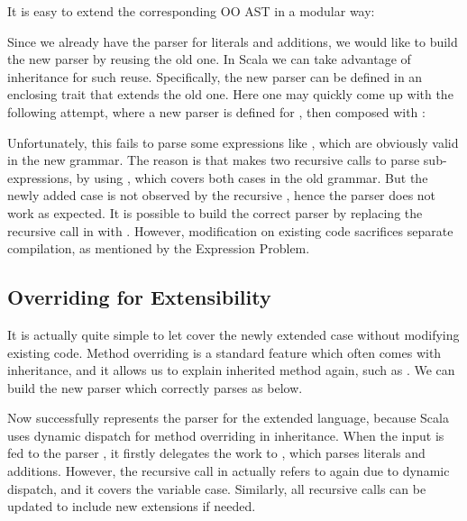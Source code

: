 It is easy to extend the corresponding OO AST in a modular way:


Since we already have the parser for literals and additions, we would
like to build the new parser by reusing the old one. In Scala we can take advantage of inheritance for such reuse. Specifically,
the new parser can be defined in an enclosing trait that extends
the old one. Here one may quickly come up
with the following attempt, where a new parser is defined for , then composed
with :


Unfortunately, this fails to parse some expressions like , which are obviously valid in the new grammar.
The reason is that  makes two recursive calls to parse sub-expressions, by using , which
covers both cases in the old grammar. But the newly added case  is not observed by the recursive ,
hence the parser does not work as expected. It is possible to build the correct parser by replacing the recursive call in  with .
However, modification on existing code sacrifices separate compilation, as mentioned by the Expression Problem.

\subsection{Overriding for Extensibility}\label{subsec:overriding}

It is actually quite simple to let  cover the newly extended case without modifying existing code. Method overriding is a standard feature which often comes with inheritance, and it allows us to explain inherited method again, such as . We can build the new parser which correctly parses  as below.


Now  successfully represents the parser for the extended language, because Scala uses dynamic dispatch for
method overriding in inheritance. When the input  is fed to the parser , it firstly delegates
the work to , which parses literals and additions. However, the recursive call  in 
actually refers to  again due to dynamic dispatch, and it covers the variable case. Similarly, all recursive calls can be updated to include new extensions if needed.

